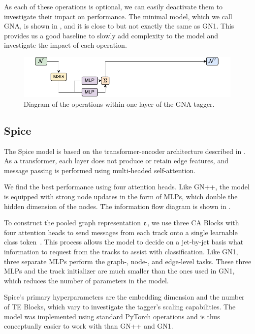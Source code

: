 As each of these operations is optional, we can easily deactivate them to investigate their impact on performance.
The minimal model, which we call GNA, is shown in , and it is close to but not exactly the same as GN1.
This provides us a good baseline to slowly add complexity to the model and investigate the impact of each operation.

\begin{figure}[h!]
    \centering
    \includegraphics[width=0.99\textwidth]{figures/flavour_tagging/gna.pdf}
    \caption{Diagram of the operations within one layer of the GNA tagger.}
    \label{fig:gna_graph}
\end{figure}

\subsection{Spice}

The Spice model is based on the transformer-encoder architecture described in .
As a transformer, each layer does not produce or retain edge features, and message passing is performed using multi-headed self-attention.

We find the best performance using four attention heads.
Like GN++, the model is equipped with strong node updates in the form of MLPs, which double the hidden dimension of the nodes.
The information flow diagram is shown in .

To construct the pooled graph representation $\mathbf{c}$, we use three CA Blocks with four attention heads to send messages from each track onto a single learnable class token~\cite{GoingDeeper}.
This process allows the model to decide on a jet-by-jet basis what information to request from the tracks to assist with classification.
Like GN1, three separate MLPs perform the graph-, node-, and edge-level tasks.
These three MLPs and the track initializer are much smaller than the ones used in GN1, which reduces the number of parameters in the model.

Spice's primary hyperparameters are the embedding dimension and the number of TE Blocks, which vary to investigate the tagger's scaling capabilities.
The model was implemented using standard PyTorch operations and is thus conceptually easier to work with than GN++ and GN1.

